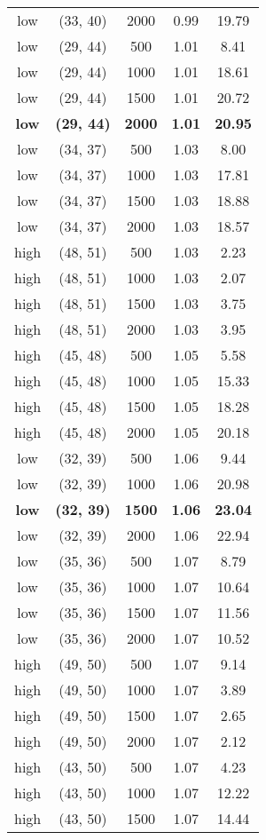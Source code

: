 \begin{tabular}{c c c c c}
low & (33, 40) &  2000 & 0.99 & 19.79 \\
low & (29, 44) &  500 & 1.01 & 8.41 \\
low & (29, 44) &  1000 & 1.01 & 18.61 \\
low & (29, 44) &  1500 & 1.01 & 20.72 \\
\textbf{low} & \textbf{(29, 44)} & \textbf{ 2000} & \textbf{1.01} & \textbf{20.95} \\
low & (34, 37) &  500 & 1.03 & 8.00 \\
low & (34, 37) &  1000 & 1.03 & 17.81 \\
low & (34, 37) &  1500 & 1.03 & 18.88 \\
low & (34, 37) &  2000 & 1.03 & 18.57 \\
high & (48, 51) &  500 & 1.03 & 2.23 \\
high & (48, 51) &  1000 & 1.03 & 2.07 \\
high & (48, 51) &  1500 & 1.03 & 3.75 \\
high & (48, 51) &  2000 & 1.03 & 3.95 \\
high & (45, 48) &  500 & 1.05 & 5.58 \\
high & (45, 48) &  1000 & 1.05 & 15.33 \\
high & (45, 48) &  1500 & 1.05 & 18.28 \\
high & (45, 48) &  2000 & 1.05 & 20.18 \\
low & (32, 39) &  500 & 1.06 & 9.44 \\
low & (32, 39) &  1000 & 1.06 & 20.98 \\
\textbf{low} & \textbf{(32, 39)} & \textbf{ 1500} & \textbf{1.06} & \textbf{23.04} \\
low & (32, 39) &  2000 & 1.06 & 22.94 \\
low & (35, 36) &  500 & 1.07 & 8.79 \\
low & (35, 36) &  1000 & 1.07 & 10.64 \\
low & (35, 36) &  1500 & 1.07 & 11.56 \\
low & (35, 36) &  2000 & 1.07 & 10.52 \\
high & (49, 50) &  500 & 1.07 & 9.14 \\
high & (49, 50) &  1000 & 1.07 & 3.89 \\
high & (49, 50) &  1500 & 1.07 & 2.65 \\
high & (49, 50) &  2000 & 1.07 & 2.12 \\
high & (43, 50) &  500 & 1.07 & 4.23 \\
high & (43, 50) &  1000 & 1.07 & 12.22 \\
high & (43, 50) &  1500 & 1.07 & 14.44 \\

\end{tabular}
